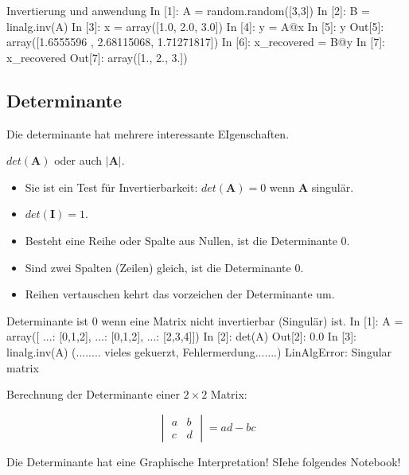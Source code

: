 \begin{python}{Invertierung und anwendung}
In [1]: A = random.random([3,3])
In [2]: B = linalg.inv(A)
In [3]: x = array([1.0, 2.0, 3.0])
In [4]: y = A@x
In [5]: y
Out[5]: array([1.6555596 , 2.68115068, 1.71271817])
In [6]: x_recovered = B@y
In [7]: x_recovered
Out[7]: array([1., 2., 3.])
\end{python}



\subsection*{Determinante}\label{sub:determinant}
Die determinante hat mehrere interessante EIgenschaften. 

$det (\mathbf{A})$ oder auch $|\mathbf{A}|$. 

\begin{itemize}
    \item Sie ist ein Test für Invertierbarkeit: $det(\mathbf{A})=0$ wenn $\mathbf{A}$ singulär.
    \item $det (\mathbf{I}) = 1$.
    \item Besteht eine Reihe oder Spalte aus Nullen, ist die Determinante 0.
    \item Sind zwei Spalten (Zeilen) gleich, ist die Determinante 0.
    \item Reihen vertauschen kehrt das vorzeichen der Determinante um.
\end{itemize}

\begin{python}{Determinante ist 0 wenn eine Matrix nicht invertierbar (Singulär) ist.}
In [1]: A = array([
    ...: [0,1,2],
    ...: [0,1,2],
    ...: [2,3,4]])
In [2]: det(A)
Out[2]: 0.0
In [3]: linalg.inv(A)
(........ vieles gekuerzt, Fehlermerdung.......)
LinAlgError: Singular matrix
\end{python}

Berechnung der Determinante einer $2 \times 2 $ Matrix:

$$ \begin{vmatrix} a & b  \\
                    c & d 

 \end{vmatrix} = ad - bc$$

Die Determinante hat eine Graphische Interpretation! SIehe folgendes Notebook!




